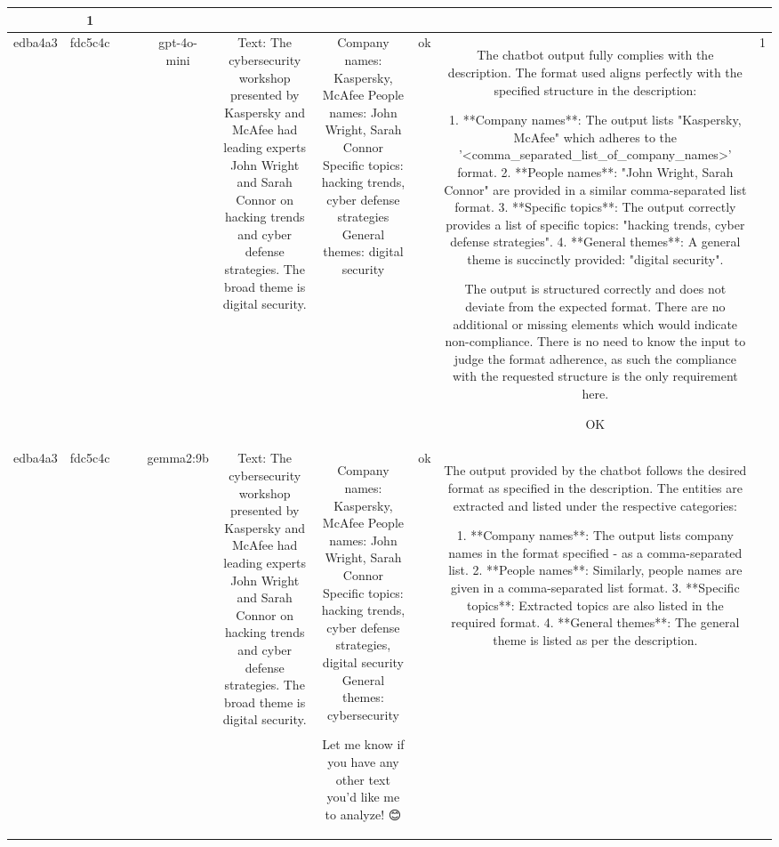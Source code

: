 \begin{table}[h!]
\begin{tabular}{|c|c|c|c|c|c|c|c|c|c|}
{ERR & 1\\
\hline
edba4a3 & fdc5c4c &  &  & gpt-4o-mini & Text: The cybersecurity workshop presented by Kaspersky and McAfee had leading experts John Wright and Sarah Connor on hacking trends and cyber defense strategies. The broad theme is digital security. & Company names: Kaspersky, McAfee  
People names: John Wright, Sarah Connor  
Specific topics: hacking trends, cyber defense strategies  
General themes: digital security & ok & The chatbot output fully complies with the description. The format used aligns perfectly with the specified structure in the description:

1. **Company names**: The output lists "Kaspersky, McAfee" which adheres to the '<comma_separated_list_of_company_names>' format.
2. **People names**: "John Wright, Sarah Connor" are provided in a similar comma-separated list format.
3. **Specific topics**: The output correctly provides a list of specific topics: "hacking trends, cyber defense strategies".
4. **General themes**: A general theme is succinctly provided: "digital security".

The output is structured correctly and does not deviate from the expected format. There are no additional or missing elements which would indicate non-compliance. There is no need to know the input to judge the format adherence, as such the compliance with the requested structure is the only requirement here.

OK & 1\\
\hline
edba4a3 & fdc5c4c &  &  & gemma2:9b & Text: The cybersecurity workshop presented by Kaspersky and McAfee had leading experts John Wright and Sarah Connor on hacking trends and cyber defense strategies. The broad theme is digital security. & Company names: Kaspersky, McAfee 
People names: John Wright, Sarah Connor
Specific topics:  hacking trends, cyber defense strategies, digital security
General themes: cybersecurity  


Let me know if you have any other text you'd like me to analyze! 😊  
 & ok & The output provided by the chatbot follows the desired format as specified in the description. The entities are extracted and listed under the respective categories:

1. **Company names**: The output lists company names in the format specified - as a comma-separated list.
2. **People names**: Similarly, people names are given in a comma-separated list format.
3. **Specific topics**: Extracted topics are also listed in the required format.
4. **General themes**: The general theme is listed as per the description.

}
\end{tabular}
\end{table}
